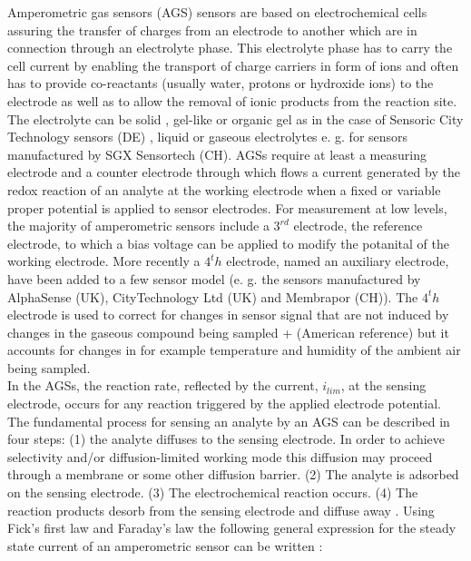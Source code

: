\documentclass[sensors,article,submit,moreauthors,pdftex]{mdpi}
\begin{document}
Amperometric gas sensors (AGS) sensors are based on electrochemical
cells assuring the transfer of charges from an electrode to another
which are in connection through an electrolyte phase. This electrolyte
phase has to carry the cell current by enabling the transport of charge
carriers in form of ions and often has to provide co-reactants (usually
water, protons or hydroxide ions) to the electrode as well as to allow
the removal of ionic products from the reaction site. The electrolyte
can be solid \citep{kumar_solid_2000}, gel-like or organic gel as in the
case of Sensoric City Technology sensors (DE)
\citep{xiong_amperometric_2014}, liquid or gaseous electrolytes e. g.
for sensors manufactured by SGX Sensortech (CH). AGSs require at least a
measuring electrode and a counter electrode through which flows a
current generated by the redox reaction of an analyte at the working
electrode when a fixed or variable proper potential is applied to sensor
electrodes. For measurement at low levels, the majority of amperometric
sensors include a \(3^{rd}\) electrode, the reference electrode, to
which a bias voltage can be applied to modify the potanital of the
working electrode. More recently a \(4^th\) electrode, named an
auxiliary electrode, have been added to a few sensor model (e. g. the
sensors manufactured by AlphaSense (UK), CityTechnology Ltd (UK) and
Membrapor (CH)). The \(4^th\) electrode is used to correct for changes
in sensor signal that are not induced by changes in the gaseous compound
being sampled \citep{popoola_development_2016} + (American reference)
but it accounts for changes in for example temperature and humidity of
the ambient air being sampled.\\
In the AGSs, the reaction rate, reflected by the current, \(i_{lim}\),
at the sensing electrode, occurs for any reaction triggered by the
applied electrode potential. The fundamental process for sensing an
analyte by an AGS can be described in four steps: (1) the analyte
diffuses to the sensing electrode. In order to achieve selectivity
and/or diffusion-limited working mode this diffusion may proceed through
a membrane or some other diffusion barrier. (2) The analyte is adsorbed
on the sensing electrode. (3) The electrochemical reaction occurs. (4)
The reaction products desorb from the sensing electrode and diffuse away
\citep{helm_measurement_2010}. Using Fick's first law and Faraday's law
the following general expression for the steady state current of an
amperometric sensor can be written \citep{helm_measurement_2010}:
\end{document}
